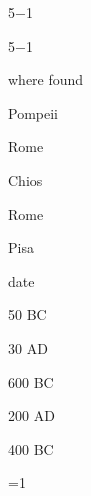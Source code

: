 \documentclass[compress,color=usenames]{beamer}
\begin{document}
\begin{frame}
5$-$1


5$-$1










where found



Pompeii



Rome



Chios



Rome



Pisa






date



50 BC



30 AD



600 BC



200 AD



400 BC





=1










\end{frame}
\end{document}
